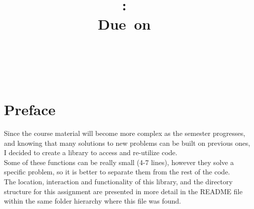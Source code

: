\documentclass{article}
\title{
\vspace{2in}
\textmd{\textbf{\hmwkClass:\ \hmwkTitle}}\\
\normalsize\vspace{0.1in}\small{Due\ on\ \hmwkDueDate}\\
\vspace{0.1in}\large{\textit{\hmwkClassInstructor\ }}
\vspace{3in}
}
\author{\textbf{\hmwkAuthorName} \\ \hmwkAuthorEmail}
\date{} %
\begin{document}
\clearpage\maketitle
\thispagestyle{empty}



\newpage
\clearpage\tableofcontents
\listoffigures
\listoftables

\thispagestyle{empty}
\newpage
\setcounter{page}{1}
\section{Preface} %
\vspace*{10pt} %
Since the course material will become more complex as the semester progresses, and knowing that many solutions to new problems can be built on previous ones, I decided to create a library to access and re-utilize code.\\

Some of these functions can be really small (4-7 lines), however they solve a specific problem, so it is better to separate them from the rest of the code.\\

The location, interaction and functionality of this library, and the directory structure for this assignment are presented in more detail in the README file within the same folder hierarchy where this file was found.
\end{document}
